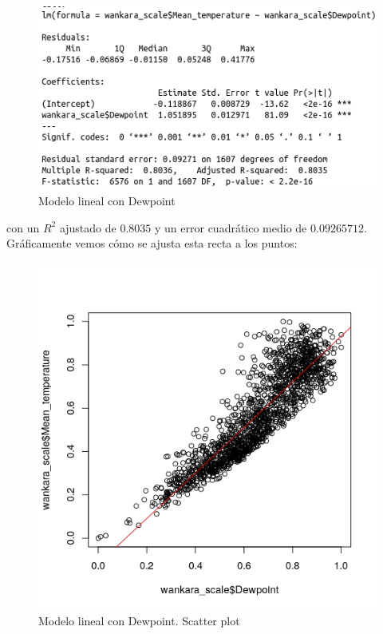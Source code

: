 \begin{figure}[H] %
	\centering
	\includegraphics[scale=0.55]{lm3.png}  %
	\caption{Modelo lineal con Dewpoint} 
	\label{fig:lm3}
\end{figure}

con un $R^2$ ajustado de $0.8035$  y un error cuadrático medio de $0.09265712$. Gráficamente vemos cómo se ajusta esta recta a los puntos:

\begin{figure}[H] %
	\centering
	\includegraphics[scale=0.55]{plot3.png}  %
	\caption{Modelo lineal con Dewpoint. Scatter plot} 
	\label{fig:plot3}
\end{figure}

